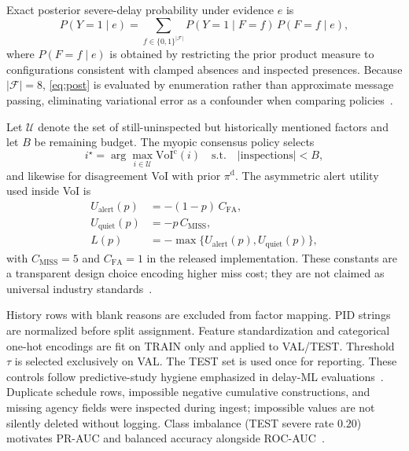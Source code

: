 
Exact posterior severe-delay probability under evidence $e$ is
\begin{equation}
P(Y{=}1\mid e)=\sum_{f\in\{0,1\}^{|\mathcal{F}|}} P(Y{=}1\mid F{=}f)\,P(F{=}f\mid e),
\label{eq:post}
\end{equation}
where $P(F{=}f\mid e)$ is obtained by restricting the prior product measure to configurations consistent with clamped absences and inspected presences. Because $|\mathcal{F}|{=}8$, \eqref{eq:post} is evaluated by enumeration rather than approximate message passing, eliminating variational error as a confounder when comparing policies~\cite{Heckerman1996,Onisko2001}.

Let $\mathcal{U}$ denote the set of still-uninspected but historically mentioned factors and let $B$ be remaining budget. The myopic consensus policy selects
\begin{equation}
i^{\star}=\arg\max_{i\in\mathcal{U}} \mathrm{VoI}^{\mathrm{c}}(i)\quad\text{s.t.}\quad |\text{inspections}|<B,
\label{eq:policy}
\end{equation}
and likewise for disagreement VoI with prior $\pi^{\mathrm{d}}$. The asymmetric alert utility used inside VoI is
\begin{align}
U_{\mathrm{alert}}(p)&=-(1-p)\,C_{\mathrm{FA}},\\
U_{\mathrm{quiet}}(p)&=-p\,C_{\mathrm{MISS}},\\
L(p)&=-\max\{U_{\mathrm{alert}}(p),U_{\mathrm{quiet}}(p)\},
\end{align}
with $C_{\mathrm{MISS}}{=}5$ and $C_{\mathrm{FA}}{=}1$ in the released implementation. These constants are a transparent design choice encoding higher miss cost; they are not claimed as universal industry standards~\cite{Howard1966,Vickers2006}.

History rows with blank reasons are excluded from factor mapping. PID strings are normalized before split assignment. Feature standardization and categorical one-hot encodings are fit on TRAIN only and applied to VAL/TEST. Threshold $\tau$ is selected exclusively on VAL. The TEST set is used once for reporting. These controls follow predictive-study hygiene emphasized in delay-ML evaluations~\cite{Egwim2021,Tagharobi2025,Saito2015}. Duplicate schedule rows, impossible negative cumulative constructions, and missing agency fields were inspected during ingest; impossible values are not silently deleted without logging. Class imbalance (TEST severe rate $0.20$) motivates PR-AUC and balanced accuracy alongside ROC-AUC~\cite{Saito2015,Hand2009}.

